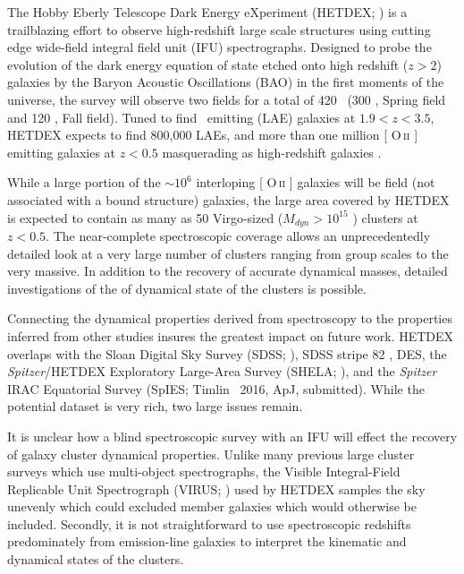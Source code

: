 \documentclass[fleqn,usenatbib]{mnras}
\makeatletter
\DeclareRobustCommand{\ion}[2]{%
\relax\ifmmode
\ifx\testbx\f@series
{\mathbf{#1\,\mathsc{#2}}}\else
{\mathrm{#1\,\mathsc{#2}}}\fi
\else\textup{#1\,{\mdseries\textsc{#2}}}%
\fi}
\makeatother
\begin{document}
The Hobby Eberly Telescope Dark Energy eXperiment (HETDEX; \citealt{Hill2008}) is a trailblazing effort to observe high-redshift large scale structures using cutting edge wide-field integral field unit (IFU) spectrographs. Designed to probe the evolution of the dark energy equation of state etched onto high redshift ($z>2$) galaxies by the Baryon Acoustic Oscillations (BAO) \citep{Eisenstein2005} in the first moments of the universe, the survey will observe two fields for a total of 420 \degsq\ (300 \degsq, Spring field and 120 \degsq, Fall field). Tuned to find \lya\ emitting (LAE) galaxies at $1.9<z<3.5$, HETDEX expects to find 800,000 LAEs, and more than one million [\ion{O}{ii}] emitting galaxies at $z<0.5$ masquerading as high-redshift galaxies \citep{Acquaviva2014}. 

While a large portion of the $\sim10^6$ interloping [\ion{O}{ii}] galaxies will be field (not associated with a bound structure) galaxies, the large area covered by HETDEX is expected to contain as many as 50 Virgo-sized ($M_{dyn}>10^{15}$ \msol) clusters at $z<0.5$. The near-complete spectroscopic coverage allows an unprecedentedly detailed look at a very large number of clusters ranging from group scales to the very massive. In addition to the recovery of accurate dynamical masses, detailed investigations of the of dynamical state of the clusters is possible. 

Connecting the dynamical properties derived from spectroscopy to the properties inferred from other studies insures the greatest impact on future work. HETDEX overlaps with the Sloan Digital Sky Survey (SDSS; \citealt{Blanton2001a}), SDSS stripe 82 \citep{Annis2014}, DES, the \emph{Spitzer}/HETDEX Exploratory Large-Area Survey (SHELA; \citealt{Papovich2016}), and the \emph{Spitzer} IRAC Equatorial Survey (SpIES; Timlin \etal\ 2016, ApJ, submitted). While the potential dataset is very rich, two large issues remain.

It is unclear how a blind spectroscopic survey with an IFU will effect the recovery of galaxy cluster dynamical properties. Unlike many previous large cluster surveys  which use multi-object spectrographs, the Visible Integral-Field Replicable Unit Spectrograph (VIRUS; \citealt{Hill2012}) used by HETDEX samples the sky unevenly which could excluded member galaxies which would otherwise be included. Secondly, it is not straightforward to use spectroscopic redshifts predominately from emission-line galaxies to interpret the kinematic and dynamical states of the clusters.
\end{document}
